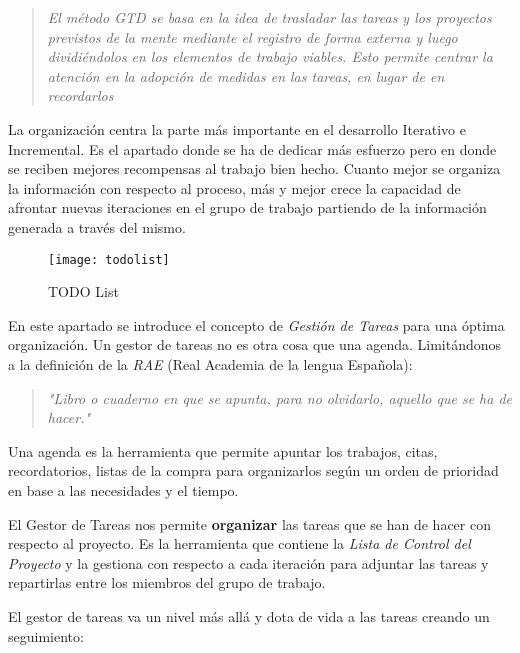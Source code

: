 \begin{quote}
    \emph{El método GTD se basa en la idea de trasladar las tareas y los proyectos previstos de la mente mediante el registro de forma externa y luego dividiéndolos en los elementos de trabajo viables. Esto permite centrar la atención en la adopción de medidas en las tareas, en lugar de en recordarlos}
\end{quote}

\par La organización centra la parte más importante en el desarrollo Iterativo e Incremental. Es el apartado donde se ha de dedicar más esfuerzo pero en donde se reciben mejores recompensas al trabajo bien hecho. Cuanto mejor se organiza la información con respecto al proceso, más y mejor crece la capacidad de afrontar nuevas iteraciones en el grupo de trabajo partiendo de la información generada a través del mismo.

\begin{figure}[H]
    \centering
    \texttt{[image: todolist]}
    \caption{TODO List}
    \label{fig:todolist.jpg}
\end{figure}

\par En este apartado se introduce el concepto de \emph{Gestión de Tareas} para una óptima organización. Un gestor de tareas no es otra cosa que una agenda. Limitándonos a la definición de la \emph{RAE} (Real Academia de la lengua Española):

\begin{quote}
    \emph{"Libro o cuaderno en que se apunta, para no olvidarlo, aquello que se ha de hacer."}
\end{quote}

\par Una agenda es la herramienta que permite apuntar los trabajos, citas, recordatorios, listas de la compra para organizarlos según un orden de prioridad en base a las necesidades y el tiempo.

\par El Gestor de Tareas nos permite \textbf{organizar} las tareas que se han de hacer con respecto al proyecto. Es la herramienta que contiene la \emph{Lista de Control del Proyecto} y la gestiona con respecto a cada iteración para adjuntar las tareas y repartirlas entre los miembros del grupo de trabajo.

\par El gestor de tareas va un nivel más allá y dota de vida a las tareas creando un seguimiento:

